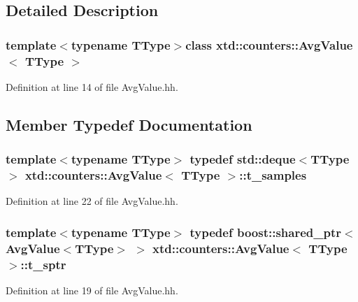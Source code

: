 \subsection{Detailed Description}
\subsubsection*{template$<$typename T\-Type$>$class xtd\-::counters\-::\-Avg\-Value$<$ T\-Type $>$}



Definition at line 14 of file Avg\-Value.\-hh.



\subsection{Member Typedef Documentation}
\hypertarget{classxtd_1_1counters_1_1AvgValue_aa58af8a852f52342b087373414e61878}{
\subsubsection[{t\-\_\-samples}]{\setlength{\rightskip}{0pt plus 5cm}template$<$typename T\-Type$>$ typedef std\-::deque$<$T\-Type$>$ {\bf xtd\-::counters\-::\-Avg\-Value}$<$ T\-Type $>$\-::{\bf t\-\_\-samples}\hspace{0.3cm}{\ttfamily [protected]}}}\label{classxtd_1_1counters_1_1AvgValue_aa58af8a852f52342b087373414e61878}


Definition at line 22 of file Avg\-Value.\-hh.

\hypertarget{classxtd_1_1counters_1_1AvgValue_a2186c119cedc1cd9c3a7a7a39e0bdc55}{
\subsubsection[{t\-\_\-sptr}]{\setlength{\rightskip}{0pt plus 5cm}template$<$typename T\-Type$>$ typedef boost\-::shared\-\_\-ptr$<${\bf Avg\-Value}$<$T\-Type$>$ $>$ {\bf xtd\-::counters\-::\-Avg\-Value}$<$ T\-Type $>$\-::{\bf t\-\_\-sptr}}}\label{classxtd_1_1counters_1_1AvgValue_a2186c119cedc1cd9c3a7a7a39e0bdc55}


Definition at line 19 of file Avg\-Value.\-hh.



